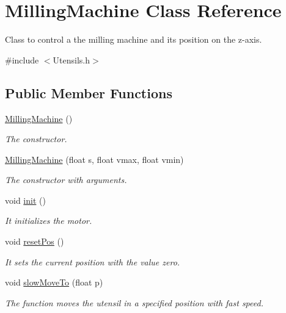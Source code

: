 \hypertarget{class_milling_machine}{\section{Milling\+Machine Class Reference}
\label{class_milling_machine}
}


Class to control a the milling machine and its position on the z-\/axis.  




{\ttfamily \#include $<$Utensils.\+h$>$}

\subsection*{Public Member Functions}
\begin{DoxyCompactItemize}
\item 
\hyperlink{class_milling_machine_adaa67d0774d9fa0ed9d51d7b5cd12a2a}{Milling\+Machine} ()
\begin{DoxyCompactList}\small\item\em The constructor. \end{DoxyCompactList}\item 
\hyperlink{class_milling_machine_a62e822e8a874059734ab483871a11489}{Milling\+Machine} (float s, float vmax, float vmin)
\begin{DoxyCompactList}\small\item\em The constructor with arguments. \end{DoxyCompactList}\item 
void \hyperlink{class_milling_machine_ad8b30fc42959606e9773e5ae7e31bac7}{init} ()
\begin{DoxyCompactList}\small\item\em It initializes the motor. \end{DoxyCompactList}\item 
void \hyperlink{class_milling_machine_a965590d4d159254dbc9a372ea35c2d63}{reset\+Pos} ()
\begin{DoxyCompactList}\small\item\em It sets the current position with the value zero. \end{DoxyCompactList}\item 
void \hyperlink{class_milling_machine_a3a9922b9041c75db25da0f63ba7830c6}{slow\+Move\+To} (float p)
\begin{DoxyCompactList}\small\item\em The function moves the utensil in a specified position with fast speed. \end{DoxyCompactList}\item 

\end{DoxyCompactItemize}
